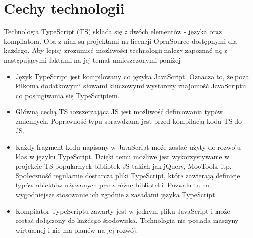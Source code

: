 \section{Cechy technologii}
Technologia TypeScript (TS) składa się z dwóch elementów - języka oraz kompilatora. Oba z nich są projektami na licencji OpenSource dostępnymi dla każdego. Aby lepiej zrozumieć możliwości technologii należy zapoznać się z następującymi faktami na jej temat umieszczonymi poniżej.
\begin{itemize}
\item Język TypeScript jest kompilowany do języka JavaScript. Oznacza to, że poza kilkoma dodatkowymi słowami kluczowymi wystarczy znajomość JavaScriptu do posługiwania się TypeScriptem. 
\item Główną cechą TS rozszerzającą JS jest możliwość definiowania typów zmiennych. Poprawność typu sprawdzana jest przed kompilacją kodu TS do JS.
\item Każdy fragment kodu napisany w JavaScript może zostać użyty do rozwoju klas w języku TypeScript. Dzięki temu możliwe jest wykorzystywanie w projekcie TS popularnych bibliotek JS takich jak jQuery, MooTools, itp. Społeczność regularnie dostarcza pliki TypeScript, które zawierają definicje typów obiektów używanych przez różne biblioteki. Pozwala  to na wygodniejsze stosowanie ich zgodnie z zasadami języka TypeScript. 
\item Kompilator TypeScriptu zawarty jest w jednym pliku JavaScript i może zostać dołączony do każdego środowiska. Technologia nie posiada maszyny wirtualnej i nie ma planów na jej rozwój.
\end{itemize}

